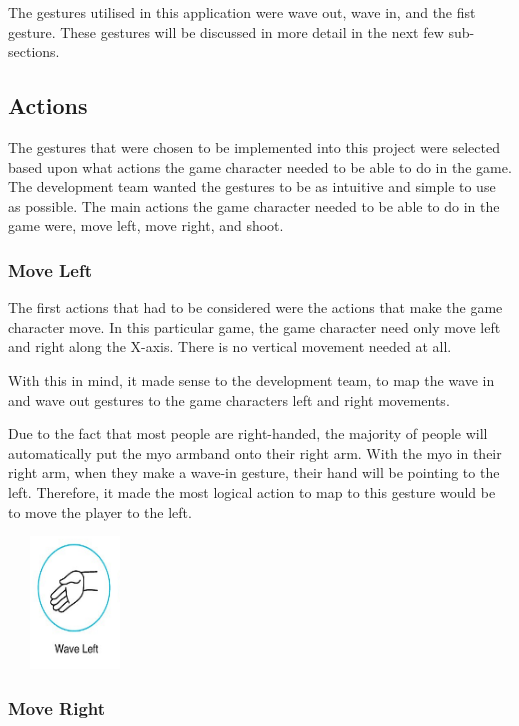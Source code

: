 \documentclass{article}
\begin{document}
\bigskip

The gestures utilised in this application were wave out, wave in, and the fist gesture. These gestures will be discussed in more detail in the next few sub-sections.

\subsection{Actions}
The gestures that were chosen to be implemented into this project were selected based upon what actions the game character needed to be able to do in the game. The development team wanted the gestures to be as intuitive and simple to use as possible. The main actions the game character needed to be able to do in the game were, move left, move right, and shoot. 



\subsubsection{Move Left}

The first actions that had to be considered were the actions that make the game character move. In this particular game, the game character need only move left and right along the X-axis. There is no vertical movement needed at all. 

With this in mind, it made sense to the development team, to map the wave in and wave out gestures to the game characters left and right movements.

\bigskip

Due to the fact that most people are right-handed, the majority of people will automatically put the myo armband onto their right arm. With the myo in their right arm, when they make a wave-in gesture, their hand will be pointing to the left. Therefore, it made the most logical action to map to this gesture would be to move the player to the left.


\includegraphics[width=100pt, height=100pt]{img/WaveLeft.PNG}

\bigskip

\subsubsection{Move Right}
\end{document}

